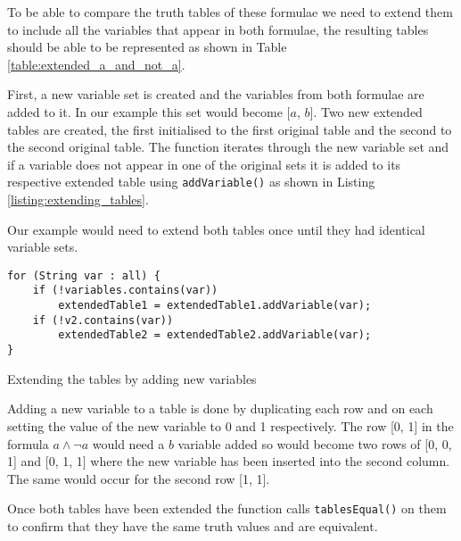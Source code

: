 \documentclass[draft]{report}
\begin{document}
To be able to compare the truth tables of these formulae we need to extend them to include all the variables that appear in both formulae, the resulting tables should be able to be represented as shown in Table \ref{table:extended_a_and_not_a}.


First, a new variable set is created and the variables from both formulae are added to it. In our example this set would become [$a$, $b$]. Two new extended tables are created, the first initialised to the first original table and the second to the second original table. The function iterates through the new variable set and if a variable does not appear in one of the original sets it is added to its respective extended table using {\tt addVariable()} as shown in Listing \ref{listing:extending_tables}. 

Our example would need to extend both tables once until they had identical variable sets.

\begin{listing}[ht]
\begin{verbatim} 
for (String var : all) {
    if (!variables.contains(var))
        extendedTable1 = extendedTable1.addVariable(var);
    if (!v2.contains(var))
        extendedTable2 = extendedTable2.addVariable(var);
}
\end{verbatim}
\caption{Extending the tables by adding new variables}
\label{listing:extending_tables}
\end{listing}

Adding a new variable to a table is done by duplicating each row and on each setting the value of the new variable to 0 and 1 respectively. The row [0, 1] in the formula $a\land\lnot a$ would need a $b$ variable added so would become two rows of [0, 0, 1] and [0, 1, 1] where the new variable has been inserted into the second column. The same would occur for the second row [1, 1].

Once both tables have been extended the function calls {\tt tablesEqual()} on them to confirm that they have the same truth values and are equivalent.
\end{document}
